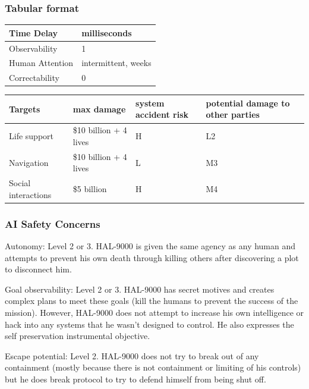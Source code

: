 \documentclass[11pt]{article}
\begin{document}
\subsubsection{Tabular format}

\begin{center}
\begin{tabular}{ |l|l| } \hline
 Time Delay & milliseconds \\ \hline
 Observability &   1 \\ \hline
 Human Attention & intermittent, weeks\\ \hline
 Correctability &  0\\ \hline
\end{tabular}
\end{center}

\begin{center}
\begin{tabular}{ |l|l|l|l| } 
 \hline
 Targets & max damage & system accident risk & potential damage to other parties\\
 \hline
 Life support         & \$10 billion + 4 lives &  H & L2  \\
 Navigation           & \$10 billion + 4 lives &  L & M3  \\
 Social interactions  & \$5 billion            &  H & M4  \\
 \hline
\end{tabular}
\end{center}

\subsubsection{AI Safety Concerns}

Autonomy: Level 2 or 3. HAL-9000 is given the same agency as any human and attempts to prevent his
own death through killing others after discovering a plot to disconnect him.

Goal observability: Level 2 or 3. HAL-9000 has secret motives and creates complex plans to meet these
goals (kill the humans to prevent the success of the mission). However, HAL-9000 does not attempt to
increase his own intelligence or hack into any systems that he wasn't designed to control. He also
expresses the self preservation instrumental objective.

Escape potential: Level 2. HAL-9000 does not try to break out of any containment (mostly because
there is not containment or limiting of his controls) but he does break protocol to try to defend
himself from being shut off. 
\end{document}
